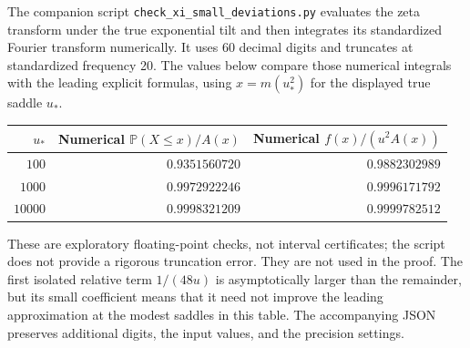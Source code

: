\documentclass[11pt]{article}
\theoremstyle{remark}\newtheorem{remark}[theorem]{Remark}
\newcommand{\Prob}{\mathbb P}
\begin{document}
The companion script \texttt{check\_xi\_small\_deviations.py} evaluates the
zeta transform under the true exponential tilt and then integrates its
standardized Fourier transform numerically. It uses 60 decimal digits and
truncates at standardized frequency 20. The values below compare those
numerical integrals with the leading explicit formulas, using
$x=m(u_*^2)$ for the displayed true saddle $u_*$.

\begin{center}
\begin{tabular}{@{}rrr@{}}
\toprule
$u_*$ & Numerical $\Prob(X\leq x)/A(x)$ & Numerical $f(x)/(u^2A(x))$\\
\midrule
$100$   & $0.9351560720$ & $0.9882302989$\\
$1000$  & $0.9972922246$ & $0.9996171792$\\
$10000$ & $0.9998321209$ & $0.9999782512$\\
\bottomrule
\end{tabular}
\end{center}

These are exploratory floating-point checks, not interval certificates;
the script does not provide a rigorous truncation error. They are not used
in the proof. The first isolated relative term $1/(48u)$ is asymptotically
larger than the remainder, but its small coefficient means that it need
not improve the leading approximation at the modest saddles in this
table. The accompanying JSON preserves additional digits, the input
values, and the precision settings.
\end{document}
